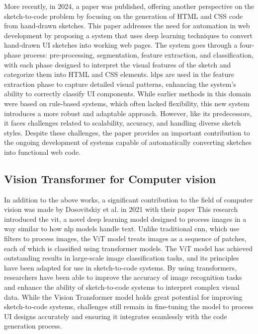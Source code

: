 More recently, in 2024, a paper \cite{10537336} was published, offering another perspective on the sketch-to-code problem by focusing on the generation of HTML and CSS code from hand-drawn sketches. This paper addresses the need for automation in web development by proposing a system that uses deep learning techniques to convert hand-drawn UI sketches into working web pages. The system goes through a four-phase process: pre-processing, segmentation, feature extraction, and classification, with each phase designed to interpret the visual features of the sketch and categorize them into HTML and CSS elements. \gls{ldps} are used in the feature extraction phase to capture detailed visual patterns, enhancing the system's ability to correctly classify UI components. While earlier methods in this domain were based on rule-based systems, which often lacked flexibility, this new system introduces a more robust and adaptable approach. However, like its predecessors, it faces challenges related to scalability, accuracy, and handling diverse sketch styles. Despite these challenges, the paper provides an important contribution to the ongoing development of systems capable of automatically converting sketches into functional web code. 

\subsection{Vision Transformer for Computer vision}
In addition to the above works, a significant contribution to the field of computer vision was made by Dosovitskiy et al. in 2021 with their paper \cite{dosovitskiy2021imageworth16x16words} This research introduced the \gls{vit}, a novel deep learning model designed to process images in a way similar to how \gls{nlp} models handle text. Unlike traditional \gls{cnn}, which use filters to process images, the ViT model treats images as a sequence of patches, each of which is classified using transformer models. The ViT model has achieved outstanding results in large-scale image classification tasks, and its principles have been adapted for use in sketch-to-code systems. By using transformers, researchers have been able to improve the accuracy of image recognition tasks and enhance the ability of sketch-to-code systems to interpret complex visual data. While the Vision Transformer model holds great potential for improving sketch-to-code systems, challenges still remain in fine-tuning the model to process UI designs accurately and ensuring it integrates seamlessly with the code generation process. 

